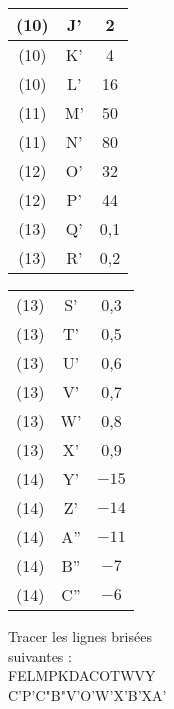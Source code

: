 \begin{activite}
\begin{QCM}
\begin{center}
\begin{tabular}{|*{3}{C{0.5}|}}
            (10) & J' & 2 \\
            \hline
             (10) & K' & 4 \\
            \hline
            (10) & L' & 16 \\
            \hline
            (11) & M' & 50 \\
            \hline
            (11) & N' & 80 \\
            \hline
            (12) & O' & 32 \\
            \hline
            (12) & P' & 44 \\
            \hline
            (13) & Q' & 0,1 \\
            \hline
            (13) & R' & 0,2 \\
            \hline
         \end{tabular}
         \hfill
         \begin{tabular}{|*{3}{C{0.5}|}}
            \hline
             &  &  \\
            \hline
            (13) & S' & 0,3 \\
            \hline
            (13) & T' & 0,5 \\
            \hline
            (13) & U' & 0,6 \\
            \hline
            (13) & V' & 0,7 \\
            \hline
            (13) & W' & 0,8 \\
            \hline
            (13) & X' & 0,9 \\
            \hline
            (14) & Y' & $-15$ \\
            \hline
            (14) & Z' & $-14$ \\
            \hline
            (14) & A'' & $-11$ \\
            \hline
            (14) & B'' & $-7$ \\
            \hline
            (14) & C'' & $-6$ \\
            \hline
         \end{tabular}
      \end{center}
      \begin{minipage}{4cm}
         Tracer les lignes brisées \\
         suivantes : \\ [3mm]
         FELMPKDACOTWVY \\
         C'P’C"B"V’O’W’X’B’XA’  \\ [3mm]

\end{minipage}
\end{QCM}
\end{activite}
